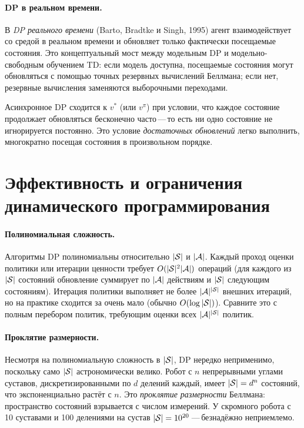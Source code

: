 \paragraph{DP в реальном времени.}
В \emph{DP реального времени} (Barto, Bradtke и Singh, 1995) агент взаимодействует со средой в реальном времени и обновляет только фактически посещаемые состояния.  Это концептуальный мост между модельным DP и модельно-свободным обучением TD: если модель доступна, посещаемые состояния могут обновляться с помощью точных резервных вычислений Беллмана; если нет, резервные вычисления заменяются выборочными переходами.

\begin{remark}
Асинхронное DP сходится к $v^*$ (или $v^\pi$) при условии, что каждое состояние продолжает обновляться бесконечно часто\,---\,то есть ни одно состояние не игнорируется постоянно.  Это условие \emph{достаточных обновлений} легко выполнить, многократно посещая состояния в произвольном порядке.
\end{remark}

\section{Эффективность и ограничения динамического программирования}
\label{sec:dp-limitations}

\paragraph{Полиномиальная сложность.}
Алгоритмы DP полиномиальны относительно $|\mathcal{S}|$ и $|\mathcal{A}|$.  Каждый проход оценки политики или итерации ценности требует $O(|\mathcal{S}|^2 |\mathcal{A}|)$ операций (для каждого из $|\mathcal{S}|$ состояний обновление суммирует по $|\mathcal{A}|$ действиям и $|\mathcal{S}|$ следующим состояниям).  Итерация политики выполняет не более $|\mathcal{A}|^{|\mathcal{S}|}$ внешних итераций, но на практике сходится за очень мало (обычно $O(\log |\mathcal{S}|)$).  Сравните это с полным перебором политик, требующим оценки всех $|\mathcal{A}|^{|\mathcal{S}|}$ политик.

\paragraph{Проклятие размерности.}
Несмотря на полиномиальную сложность в $|\mathcal{S}|$, DP нередко неприменимо, поскольку само $|\mathcal{S}|$ астрономически велико.  Робот с $n$ непрерывными углами суставов, дискретизированными по $d$ делений каждый, имеет $|\mathcal{S}| = d^n$ состояний, что экспоненциально растёт с $n$.  Это \emph{проклятие размерности} Беллмана: пространство состояний взрывается с числом измерений.  У скромного робота с 10 суставами и 100 делениями на сустав $|\mathcal{S}| = 10^{20}$\,---\,безнадёжно неприемлемо.

